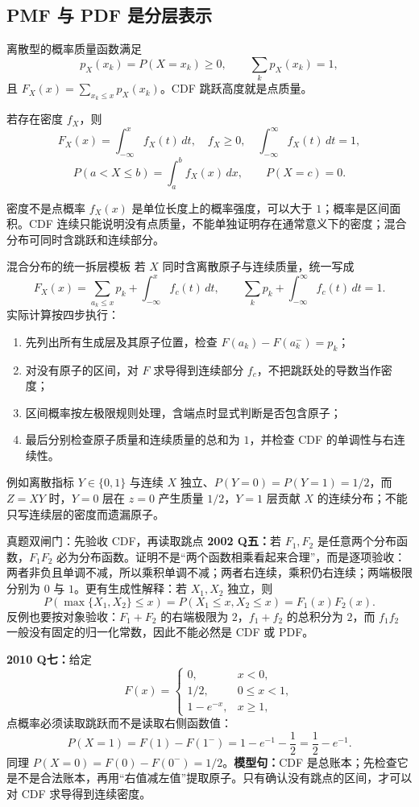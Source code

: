 \documentclass[11pt,a4paper]{ctexart}
\newcommand{\kw}[1]{\textbf{\color{deep}#1}}
\begin{document}
\subsection{PMF 与 PDF 是分层表示}
离散型的概率质量函数满足
\[
p_X(x_k)=P(X=x_k)\ge0,\qquad \sum_kp_X(x_k)=1,
\]
且 $F_X(x)=\sum_{x_k\le x}p_X(x_k)$。CDF 跳跃高度就是点质量。

若存在密度 $f_X$，则
\[
F_X(x)=\int_{-\infty}^{x}f_X(t)\,dt,\quad f_X\ge0,\quad \int_{-\infty}^{\infty}f_X(t)\,dt=1,
\]
\[
P(a<X\le b)=\int_a^bf_X(x)\,dx,\qquad P(X=c)=0.
\]

\begin{warnbox}{密度不是点概率}
$f_X(x)$ 是单位长度上的概率强度，可以大于 $1$；概率是区间面积。CDF 连续只能说明没有点质量，不能单独证明存在通常意义下的密度；混合分布可同时含跳跃和连续部分。
\end{warnbox}

\begin{methodbox}{混合分布的统一拆层模板}
若 $X$ 同时含离散原子与连续质量，统一写成
\[
F_X(x)=\sum_{a_k\le x}p_k+\int_{-\infty}^{x}f_c(t)\,dt,
\qquad
\sum_kp_k+\int_{-\infty}^{\infty}f_c(t)\,dt=1.
\]
实际计算按四步执行：
\begin{enumerate}
  \item 先列出所有生成层及其原子位置，检查 $F(a_k)-F(a_k^-)=p_k$；
  \item 对没有原子的区间，对 $F$ 求导得到连续部分 $f_c$，不把跳跃处的导数当作密度；
  \item 区间概率按左极限规则处理，含端点时显式判断是否包含原子；
  \item 最后分别检查原子质量和连续质量的总和为 $1$，并检查 CDF 的单调性与右连续性。
\end{enumerate}
例如离散指标 $Y\in\{0,1\}$ 与连续 $X$ 独立、$P(Y=0)=P(Y=1)=1/2$，而 $Z=XY$ 时，$Y=0$ 层在 $z=0$ 产生质量 $1/2$，$Y=1$ 层贡献 $X$ 的连续分布；不能只写连续层的密度而遗漏原子。
\end{methodbox}

\begin{examplebox}{真题双闸门：先验收 CDF，再读取跳点}
\textbf{2002 Q五：}若 $F_1,F_2$ 是任意两个分布函数，$F_1F_2$ 必为分布函数。证明不是“两个函数相乘看起来合理”，而是逐项验收：两者非负且单调不减，所以乘积单调不减；两者右连续，乘积仍右连续；两端极限分别为 $0$ 与 $1$。更有生成性解释：若 $X_1,X_2$ 独立，则
\[
P(\max\{X_1,X_2\}\le x)=P(X_1\le x,X_2\le x)=F_1(x)F_2(x).
\]
反例也要按对象验收：$F_1+F_2$ 的右端极限为 $2$，$f_1+f_2$ 的总积分为 $2$，而 $f_1f_2$ 一般没有固定的归一化常数，因此不能必然是 CDF 或 PDF。

\textbf{2010 Q七：}给定
\[
F(x)=\begin{cases}0,&x<0,\\[1pt]1/2,&0\le x<1,\\[1pt]1-e^{-x},&x\ge1,\end{cases}
\]
点概率必须读取跳跃而不是读取右侧函数值：
\[
P(X=1)=F(1)-F(1^-)=1-e^{-1}-\frac12=\frac12-e^{-1}.
\]
同理 $P(X=0)=F(0)-F(0^-)=1/2$。\kw{模型句：}CDF 是总账本；先检查它是不是合法账本，再用“右值减左值”提取原子。只有确认没有跳点的区间，才可以对 CDF 求导得到连续密度。
\end{examplebox}
\end{document}
